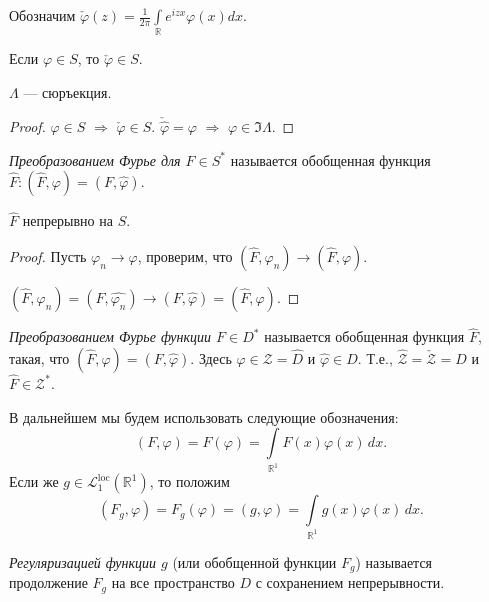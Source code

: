 \documentclass[10pt,titlepage, a4paper]{article}
\begin{document}
Обозначим $\check \varphi(z)=
\frac{1}{2\pi}\int\limits_{\mathbb{R}}e^{izx}\varphi(x)dx$.

\begin{predl}
Если $\varphi\in S$, то $\check\varphi\in S$.
\end{predl}

\begin{predl}
$\Lambda$ --- сюръекция.
\end{predl}

\begin{proof}
$\varphi\in S$ $\Rightarrow$ $\check\varphi\in S$.
$\check{\hat\varphi}=\varphi$ $\Rightarrow$ $\varphi\in \Im
\Lambda$.
\end{proof}


\begin{defen}
\emph{Преобразованием Фурье для $F\in S^*$} называется обобщенная
функция $\hat F : (\hat F,\varphi)=(F,\hat\varphi)$.
\end{defen}

\begin{predl}
$\hat F$ непрерывно на $S$.
\end{predl}

\begin{proof}
Пусть $\varphi_n\rightarrow\varphi$, проверим, что $(\hat
F,\varphi_n)\rightarrow (\hat F,\varphi)$.

$(\hat F,\varphi_n)=(F,\widehat{\varphi_n})\rightarrow
(F,\hat\varphi)=(\hat F,\varphi)$.
\end{proof}

\lecture

\begin{defen}
\emph{Преобразованием Фурье функции $F\in D^*$} называется
обобщенная функция $\hat{F}$, такая, что
$(\hat{F},\varphi)=(F,\hat{\varphi})$. Здесь $\varphi\in
\mathcal{Z}=\hat{D}$ и $\hat{\varphi}\in D$. Т.е.,
$\hat{\mathcal{Z}}=\check{\mathcal{Z}}=D$ и
$\hat{F}\in\mathcal{Z}^*$.
\end{defen}

В дальнейшем мы будем использовать следующие обозначения:
$$(F,\varphi)=F(\varphi)=\int\limits_{\mathbb{R}^1}\!F(x)\varphi(x)\,dx.$$
Если же $g\in\mathcal{L}^{\mathrm{loc}}_1(\mathbb{R}^1)$, то положим
$$(F_g,\varphi)=F_g(\varphi)=(g,\varphi)=\int\limits_{\mathbb{R}^1}\!g(x)\varphi(x)\,dx.$$

\begin{defen}
\emph{Регуляризацией функции $g$} (или обобщенной функции $F_g$)
называется продолжение $F_g$ на все пространство $D$ с сохранением
непрерывности.
\end{defen}
\end{document}
